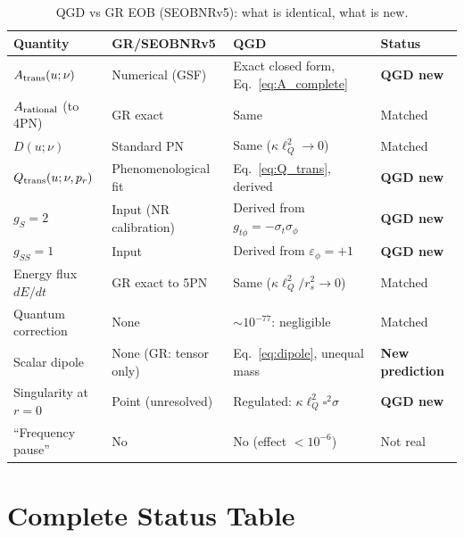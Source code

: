 \documentclass[11pt,a4paper]{article}
\theoremstyle{plain}
\theoremstyle{definition}
\theoremstyle{remark}
\newcommand{\lQ}{\ell_Q}
\newcommand{\rs}{r_s}
\begin{document}
\begin{table}[h]
\centering\small\renewcommand{\arraystretch}{1.3}
\caption{QGD vs GR EOB (SEOBNRv5): what is identical, what is new.}
\label{tab:comparison}
\begin{tabular}{@{}p{4cm}p{3.5cm}p{3.5cm}p{2.5cm}@{}}
\toprule
Quantity & GR/SEOBNRv5 & QGD & Status \\
\midrule
$A_{\rm trans}(u;\nu)$ & Numerical (GSF) & Exact closed form, Eq.~\eqref{eq:A_complete} &
  \textcolor{confirmed}{\textbf{QGD new}} \\
$A_{\rm rational}$ (to 4PN) & GR exact & Same & Matched \\
$D(u;\nu)$ & Standard PN & Same ($\kappa\lQ^2\to0$) & Matched \\
$Q_{\rm trans}(u;\nu,p_r)$ & Phenomenological fit & Eq.~\eqref{eq:Q_trans}, derived &
  \textcolor{confirmed}{\textbf{QGD new}} \\
$g_S=2$ & Input (NR calibration) & Derived from $g_{t\phi}=-\sigma_t\sigma_\phi$ &
  \textcolor{confirmed}{\textbf{QGD new}} \\
$g_{SS}=1$ & Input & Derived from $\varepsilon_\phi=+1$ &
  \textcolor{confirmed}{\textbf{QGD new}} \\
Energy flux $dE/dt$ & GR exact to 5PN & Same ($\kappa\lQ^2/\rs^2\to0$) & Matched \\
Quantum correction & None & $\sim10^{-77}$: negligible & Matched \\
Scalar dipole & None (GR: tensor only) & Eq.~\eqref{eq:dipole}, unequal mass &
  \textcolor{predicted}{\textbf{New prediction}} \\
Singularity at $r=0$ & Point (unresolved) & Regulated: $\kappa\lQ^2\square^2\sigma$ &
  \textcolor{confirmed}{\textbf{QGD new}} \\
``Frequency pause'' & No & No (effect $<10^{-6}$) & \textcolor{open}{Not real} \\
\bottomrule
\end{tabular}
\end{table}

\section{Complete Status Table}
\label{sec:status}
\end{document}
